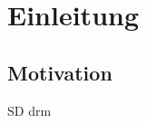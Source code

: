 
\chapter{\label{introduction}Einleitung}
\thispagestyle{fancy}

\section{\label{introduction:motivation}Motivation}

\cite{moneylandch_ag_netflix_2020}

\acrfull{SD}
\acrshort{drm}